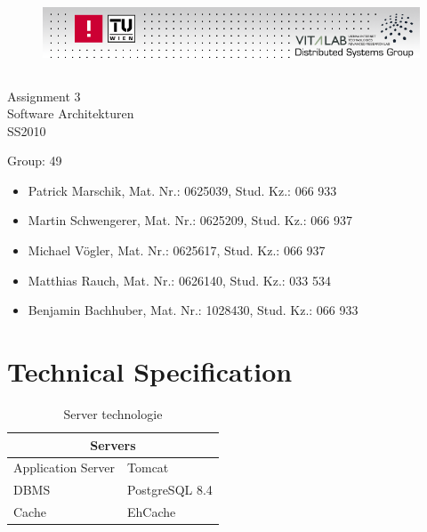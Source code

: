 \documentclass[11pt]{article}
\newcommand{\groupNr}{49}
\newcommand{\assignmentNr}{3}
\begin{document}
{	
	\begin{figure}[h]
	\hspace{-1cm}
	\includegraphics[height=23mm, width=170mm]{dsg-logo.png}
	\end{figure}

	\vspace{25mm}
	\centering
	{ \sffamily \Huge Assignment \assignmentNr } \\ \vspace{1mm}
	Software Architekturen \\ SS2010 \\ \vspace{10mm}
}

\noindent Group: \groupNr 
\begin{itemize}
\item Patrick Marschik, Mat. Nr.: 0625039, Stud. Kz.: 066 933 
\item Martin Schwengerer, Mat. Nr.: 0625209, Stud. Kz.: 066 937
\item Michael V\"ogler, Mat. Nr.: 0625617, Stud. Kz.: 066 937
\item Matthias Rauch, Mat. Nr.: 0626140, Stud. Kz.: 033 534
\item Benjamin Bachhuber, Mat. Nr.: 1028430, Stud. Kz.: 066 933 
\end{itemize}

\newpage
\tableofcontents

\newpage

\section{Technical Specification}

\begin{table}[h]
	\begin{tabularx}{\textwidth}{| X | X |}
	\hline
	\multicolumn{2}{|c|}{\textbf{Servers}} \\
	\hline
	\cellcolor[gray]{0.9}
	Application Server & Tomcat\\
	\hline
	\cellcolor[gray]{0.9}
	DBMS & PostgreSQL 8.4\\
	\hline
	\cellcolor[gray]{0.9}
	Cache & EhCache\\
	\hline
	\end{tabularx}
	\caption{Server technologie}
	\label{server_tech}
\end{table}
\end{document}
